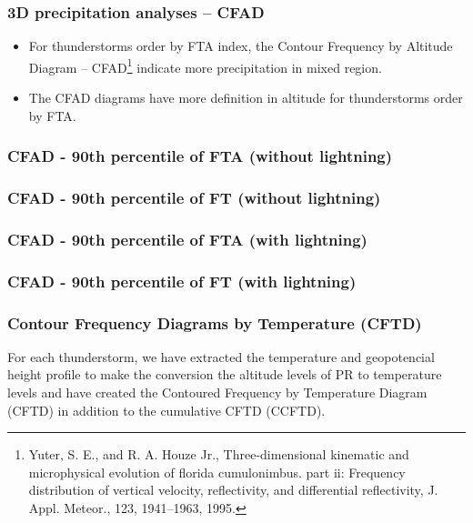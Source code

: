 \documentclass[smaller]{beamer}
\begin{document}
\begin{frame}
\frametitle{3D precipitation analyses -- CFAD}
\begin{itemize}

\item For thunderstorms order by FTA index, the Contour Frequency by Altitude Diagram -- CFAD\footnote{Yuter, S. E., and R. A. Houze Jr., Three-dimensional kinematic and microphysical evolution of florida cumulonimbus.
part ii: Frequency distribution of vertical velocity, reflectivity, and differential reflectivity, J. Appl. Meteor., 123,
1941–1963, 1995.} indicate more precipitation in mixed region.
\item The CFAD diagrams have more definition in altitude for thunderstorms order by FTA.
\end{itemize}
\end{frame}
  
\begin{frame}
\frametitle{CFAD - 90th percentile of FTA (without lightning)}

\end{frame}

\begin{frame}
\frametitle{CFAD - 90th percentile of FT (without lightning)}

\end{frame}

\begin{frame}
\frametitle{CFAD - 90th percentile of FTA (with lightning) }

\end{frame}

\begin{frame}
\frametitle{CFAD - 90th percentile of FT (with lightning)}

\end{frame}



\begin{frame}
\frametitle{Contour Frequency Diagrams by Temperature (CFTD)}
For each thunderstorm, we have extracted the temperature and
geopotencial height profile to make the conversion the altitude levels of PR to temperature levels and have created the Contoured Frequency by Temperature Diagram (CFTD) in addition to the cumulative CFTD (CCFTD).
\end{frame}
\end{document}
